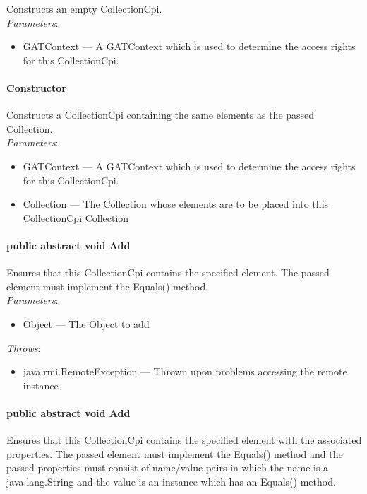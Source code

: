 \documentclass[$Date: 2003/06/26 19:29:31 $]{glabarticle}
\begin{document}
Constructs an empty CollectionCpi.\\

\textit{Parameters}:
\begin{itemize}
\item[] GATContext --- A GATContext which is used to determine the access rights for this CollectionCpi.
\end{itemize}
 
\paragraph{Constructor}

Constructs a CollectionCpi containing the same elements as the passed
Collection.\\

\textit{Parameters}:
\begin{itemize}
\item[] GATContext --- A GATContext which is used to determine the access rights for this CollectionCpi.
\item[] Collection ---  The Collection whose elements are to be placed into this CollectionCpi
Collection
\end{itemize}

\paragraph{public abstract void Add}

Ensures that this CollectionCpi contains the specified element. The
passed element must implement the Equals() method.\\

\textit{Parameters}:
\begin{itemize}
\item[] Object --- The Object to add 
\end{itemize}

 \textit{Throws}:
 \begin{itemize}
 \item[] java.rmi.RemoteException --- Thrown upon problems accessing the remote instance 
 \end{itemize}

\paragraph{public abstract void Add}

Ensures that this CollectionCpi contains the specified element with the
associated properties. The passed element must implement the Equals()
method and the passed properties must consist of name/value pairs in
which the name is a java.lang.String and the value is an instance which has an
Equals() method.\\
\end{document}
